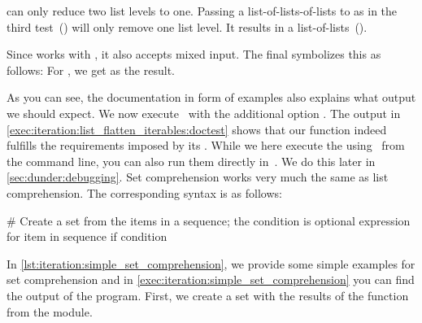 can only reduce two list levels to one.
Passing a list-of-lists-of-lists to  as in the third test~() will only remove one list level.
It results in a list-of-lists~(\pythonil{[[1], [2], [3], [4], [5], [6]]}).%
%
\begin{sloppypar}%
Since  works with , it also accepts mixed input.
The final  symbolizes this as follows:
For , we get \pythonil{[1, 2, 3, 4, 5, 6, 'a', 'b']} as the result.
\end{sloppypar}%
%
As you can see, the documentation in form of examples also explains what output we should expect.
We now execute \pytest\ with the additional option .
The output in \cref{exec:iteration:list_flatten_iterables:doctest} shows that our function indeed fulfills the requirements imposed by its .%
%
%
%
While we here execute the  using \pytest\ from the command line, you can also run them directly in~\pycharm.
We do this later in \cref{sec:dunder:debugging}.%
%
\FloatBarrier%
\endhsection%
%
%
%
Set comprehension works very much the same as list comprehension.
The corresponding syntax is as follows:%
%
\begin{pythonSyntax}
# Create a set from the items in a sequence; the condition is optional
{expression for item in sequence if condition}
\end{pythonSyntax}
%
%
%
%
In \cref{lst:iteration:simple_set_comprehension}, we provide some simple examples for set comprehension and in \cref{exec:iteration:simple_set_comprehension} you can find the output of the program.
First, we create a set with the results of the  function from the  module.
